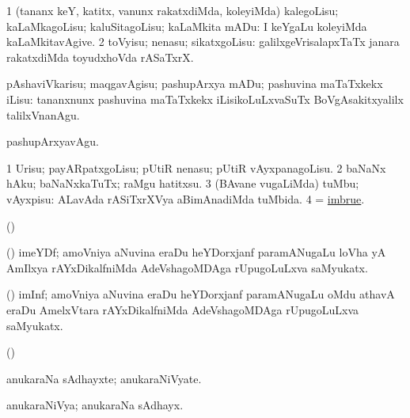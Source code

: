 \bentry
{}
\gl{\sakirx}
\bmng
\bnum
\num{1} (tananx keY, katitx, \mo vanunx rakatxdiMda, koleyiMda) kalegoLisu; kaLaMkagoLisu; kaluSitagoLisu; kaLaMkita mADu:  I keYgaLu koleyiMda kaLaMkitavAgive. 
\num{2} toVyisu; nenasu; sikatxgoLisu:  galilxgeVrisalapxTaTx janara rakatxdiMda toyudxhoVda rASaTxrX. 
\enum
\emng
\eentry

\bentry
{}
\gl{\sakirx}
\bmng
pAshaviVkarisu; maqgavAgisu; pashupArxya mADu; pashuvina maTaTxkekx iLisu:  tananxnunx pashuvina maTaTxkekx iLisikoLuLxvaSuTx BoVgAsakitxyalilx talilxVnanAgu. 
\emng

\noindent
\gl{\akirx}
\bmng
pashupArxyavAgu. 
\emng
\eentry

\bentry
{}
\gl{\sakirx}
\bmng
\bnum
\num{1} Urisu; payARpatxgoLisu; pUtiR nenasu; pUtiR vAyxpanagoLisu. 
\num{2} baNaNx hAku; baNaNxkaTuTx; raMgu hatitxsu. 
\num{3} (BAvane \mo vugaLiMda) tuMbu; vAyxpisu:  ALavAda rASiTxrXVya aBimAnadiMda tuMbida. 
\num{4}  = \hyperlink{imbrue}{imbrue}. 
\enum
\emng
\eentry

\bentry
{}
\gl{\saMkiSx}
\bmng
(\birx)  
\emng
\eentry

\bentry
{}
\gl{\saMkiSx}
\bmng
{} 
\emng
\eentry

\bentry
{}
\gl{\nA}
\bmng
(\ravi) imeYDf; amoVniya aNuvina eraDu heYDorxjanf paramANugaLu loVha yA AmIlxya rAYxDikalfniMda AdeVshagoMDAga rUpugoLuLxva saMyukatx. 
\emng
\eentry

\bentry
{}
\gl{\nA}
\bmng
(\ravi) imInf; amoVniya aNuvina eraDu heYDorxjanf paramANugaLu oMdu athavA eraDu AmelxVtara rAYxDikalfniMda AdeVshagoMDAga rUpugoLuLxva saMyukatx. 
\emng
\eentry

\bentry
{}
\gl{\saMkiSx}
\bmng
(\birx)  
\emng
\eentry

\bentry
{}
\gl{\nA}
\bmng
anukaraNa sAdhayxte; anukaraNiVyate. 
\emng
\eentry

\bentry
{}
\gl{\gu}
\bmng
anukaraNiVya; anukaraNa sAdhayx. 
\emng
\eentry

